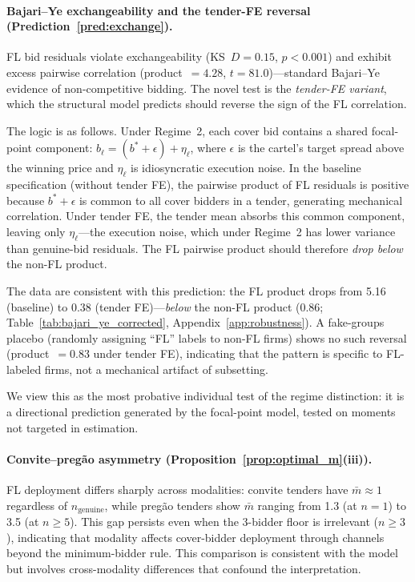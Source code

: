 \paragraph{Bajari--Ye exchangeability and the tender-FE reversal
(Prediction~\ref{pred:exchange}).}
FL bid residuals violate exchangeability (KS~$D = 0.15$,
$p < 0.001$) and exhibit excess pairwise correlation
(product~$= 4.28$, $t = 81.0$)---standard Bajari--Ye evidence of
non-competitive bidding. The novel test is the \emph{tender-FE
variant}, which the structural model predicts should reverse the
sign of the FL correlation.

The logic is as follows. Under Regime~2, each cover bid contains a
shared focal-point component: $b_\ell = (b^* + \epsilon) + \eta_\ell$,
where $\epsilon$ is the cartel's target spread above the winning price
and $\eta_\ell$ is idiosyncratic execution noise. In the baseline
specification (without tender FE), the pairwise product of FL
residuals is positive because $b^* + \epsilon$ is common to all
cover bidders in a tender, generating mechanical correlation. Under
tender FE, the tender mean absorbs this common component, leaving
only $\eta_\ell$---the execution noise, which under Regime~2 has
lower variance than genuine-bid residuals. The FL pairwise product
should therefore \emph{drop below} the non-FL product.

The data are consistent with this prediction: the FL product drops from 5.16
(baseline) to 0.38 (tender FE)---\emph{below} the non-FL product
(0.86; Table~\ref{tab:bajari_ye_corrected},
Appendix~\ref{app:robustness}). A fake-groups placebo (randomly
assigning ``FL'' labels to non-FL firms) shows no such reversal
(product~$= 0.83$ under tender FE), indicating that the pattern is
specific to FL-labeled firms, not a mechanical artifact of
subsetting.

We view this as the most probative individual test of the regime
distinction: it is a directional prediction generated by the
focal-point model, tested on moments not targeted in estimation.

\paragraph{Convite--preg\~ao asymmetry
(Proposition~\ref{prop:optimal_m}(iii)).}
FL deployment differs sharply across modalities: convite tenders
have $\bar{m} \approx 1$ regardless of $n_{\text{genuine}}$, while
preg\~ao tenders show $\bar{m}$ ranging from 1.3 (at $n = 1$) to
3.5 (at $n \geq 5$). This gap persists even when the 3-bidder floor
is irrelevant ($n \geq 3$), indicating that modality affects
cover-bidder deployment through channels beyond the minimum-bidder
rule. This comparison is consistent with the model but involves
cross-modality differences that confound the interpretation.

